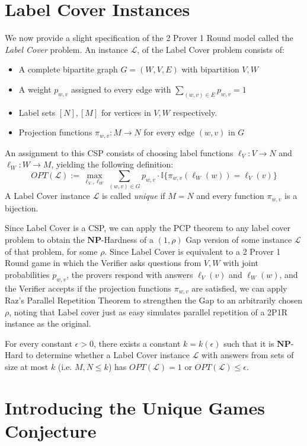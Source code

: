 \documentclass{article}
\newcommand{\NP}{\ensuremath{\mathbf{NP}}}
\newcommand{\e}{\epsilon}
\newcommand{\Ind}{\mathbb{I}}
\renewcommand{\L}{\ensuremath{\mathcal{L}}}
\newcommand{\OPT}{\ensuremath{\mathit{OPT}}}
\newcommand{\1}{\mathbbm{1}}
\begin{document}
\section{Label Cover Instances}

We now provide a slight specification of the 2 Prover 1 Round model called the \textit{Label Cover} problem. An instance \L, of the Label Cover problem consists of:
\begin{itemize}
\item A complete bipartite graph $G=(W,V,E)$ with bipartition $V, W$
\item A weight $p_{w,v}$ assigned to every edge with $\sum_{(w,v)\in E}p_{w,v} = 1$
\item Label sets $[N], [M]$ for vertices in $V, W$ respectively.
\item Projection functions $\pi_{w,v} : M \to N$ for every edge $(w,v)$ in $G$
\end{itemize}
An assignment to this CSP consists of choosing label functions $\ell_V: V \to N$ and $\ell_W: W \to M$, yielding the following definition:
\[OPT(\L) := \max_{\ell_V,\ell_W} \sum_{(w,v) \in G}p_{w,v}\cdot\Ind\{\pi_{w,v}(\ell_W(w)) = \ell_V(v)\}\]
A Label Cover instance $\L$ is called \textit{unique} if $M = N$ and every function $\pi_{w,v}$ is a bijection.


Since Label Cover is a CSP, we can apply the PCP theorem to any label cover problem to obtain the \NP-Hardness of a $(1, \rho)$ Gap version of some instance $\L$ of that problem, for some $\rho$. Since Label Cover is equivalent to a 2 Prover 1 Round game in which the Verifier asks questions from $V, W$ with joint probabilities $p_{w,v}$, the provers respond with answers $\ell_V(v)$ and $\ell_W(w)$, and the Verifier accepts if the projection functions $\pi_{w,v}$ are satisfied, we can apply Raz's Parallel Repetition Theorem to strengthen the Gap to an arbitrarily chosen $\rho$, noting that Label cover just as easy simulates parallel repetition of a 2P1R instance as the original.
\begin{theorem}
  For every constant $\e > 0$, there exists a constant $k = k(\e)$ such that it is \NP-Hard to determine whether a Label Cover instance $\L$ with answers from sets of size at most $k$ (i.e. $M, N \le k$) has $\OPT(\L) = 1$ or $\OPT(\L) \le \e$.
\end{theorem}

\section{Introducing the Unique Games Conjecture}
\end{document}
